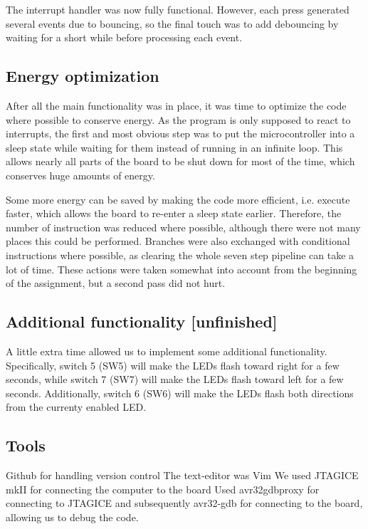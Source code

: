 The interrupt handler was now fully functional. However, each press generated several events due to bouncing, so the final touch was to add debouncing by waiting for a short while before processing each event.
\subsection{Energy optimization}

After all the main functionality was in place, it was time to optimize the code where possible to conserve energy. As the program is only supposed to react to interrupts, the first and most obvious step was to put the microcontroller into a sleep state while waiting for them instead of running in an infinite loop. This allows nearly all parts of the board to be shut down for most of the time, which conserves huge amounts of energy.

Some more energy can be saved by making the code more efficient, i.e. execute faster, which allows the board to re-enter a sleep state earlier. Therefore, the number of instruction was reduced where possible, although there were not many places this could be performed. Branches were also exchanged with conditional instructions where possible, as clearing the whole seven step pipeline can take a lot of time. These actions were taken somewhat into account from the beginning of the assignment, but a second pass did not hurt.
\subsection{Additional functionality [unfinished]}

A little extra time allowed us to implement some additional functionality. Specifically, switch 5 (SW5) will make the LEDs flash toward right for a few seconds, while switch 7 (SW7) will make the LEDs flash toward left for a few seconds. Additionally, switch 6 (SW6) will make the LEDs flash both directions from the currenty enabled LED.

\subsection{Tools}


Github for handling version control
The text-editor was Vim
We used JTAGICE mkII for connecting the computer to the board
Used avr32gdbproxy for connecting to JTAGICE and subsequently avr32-gdb for connecting to the board, allowing us to debug the code.

